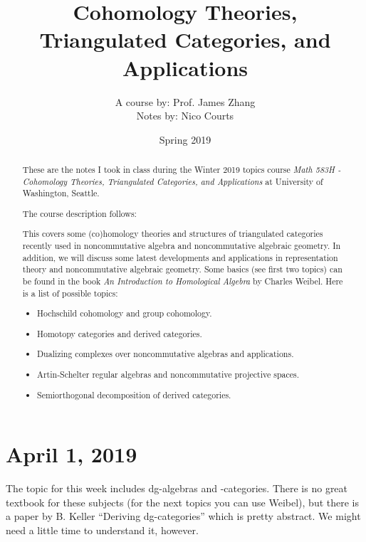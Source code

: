 \documentclass[12pt]{article}
\begin{document}
\title{Cohomology Theories, Triangulated Categories, and Applications\vspace{-1ex}}
\author{A course by: Prof. James Zhang\\
Notes by: Nico Courts}
\date{Spring 2019}
\maketitle

\renewcommand{\abstractname}{Introduction}
\begin{abstract}
	These are the notes I took in class during the Winter 2019 topics course
	\textit{Math 583H - Cohomology Theories, Triangulated Categories, and Applications} at University of Washington, Seattle. 
	
	The course description follows:

	\brk

	This covers some (co)homology theories and structures of triangulated categories recently used in noncommutative algebra and 
	noncommutative algebraic geometry. In addition, we will discuss some latest developments and applications in representation 
	theory and noncommutative algebraic geometry. Some basics (see first two topics) can be found in the book \textit{An Introduction to Homological Algebra}
	by Charles Weibel. Here is a list of possible topics:

\begin{itemize}
	\item Hochschild cohomology and group cohomology.
	\item Homotopy categories and derived categories.
	\item Dualizing complexes over noncommutative algebras and applications.
	\item Artin-Schelter regular algebras and noncommutative projective spaces.
	\item Semiorthogonal decomposition of derived categories.
\end{itemize}
\end{abstract}

\section{April 1, 2019}

The topic for this week includes dg-algebras and -categories. There is no great 
textbook for these subjects (for the next topics you can use Weibel), but there is 
a paper by B. Keller ``Deriving dg-categories'' which is pretty abstract. We might 
need a little time to understand it, however.
\end{document}
